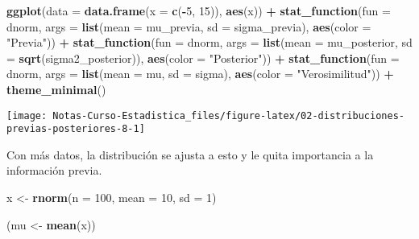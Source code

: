 \documentclass[
  12pt,
]{book}
\newenvironment{Shaded}{\begin{snugshade}}{\end{snugshade}}
\newcommand{\DataTypeTok}[1]{\textcolor[rgb]{0.13,0.29,0.53}{#1}}
\newcommand{\DecValTok}[1]{\textcolor[rgb]{0.00,0.00,0.81}{#1}}
\newcommand{\KeywordTok}[1]{\textcolor[rgb]{0.13,0.29,0.53}{\textbf{#1}}}
\newcommand{\NormalTok}[1]{#1}
\newcommand{\OperatorTok}[1]{\textcolor[rgb]{0.81,0.36,0.00}{\textbf{#1}}}
\newcommand{\StringTok}[1]{\textcolor[rgb]{0.31,0.60,0.02}{#1}}
\begin{document}
\begin{Shaded}
\begin{Highlighting}[]
\KeywordTok{ggplot}\NormalTok{(}\DataTypeTok{data =} \KeywordTok{data.frame}\NormalTok{(}\DataTypeTok{x =} \KeywordTok{c}\NormalTok{(}\OperatorTok{{-}}\DecValTok{5}\NormalTok{, }\DecValTok{15}\NormalTok{)), }\KeywordTok{aes}\NormalTok{(x)) }\OperatorTok{+}
\StringTok{  }\KeywordTok{stat\_function}\NormalTok{(}\DataTypeTok{fun =}\NormalTok{ dnorm, }\DataTypeTok{args =} \KeywordTok{list}\NormalTok{(}\DataTypeTok{mean =}\NormalTok{ mu\_previa, }\DataTypeTok{sd =}\NormalTok{ sigma\_previa), }\KeywordTok{aes}\NormalTok{(}\DataTypeTok{color =} \StringTok{"Previa"}\NormalTok{)) }\OperatorTok{+}
\StringTok{  }\KeywordTok{stat\_function}\NormalTok{(}\DataTypeTok{fun =}\NormalTok{ dnorm, }\DataTypeTok{args =} \KeywordTok{list}\NormalTok{(}\DataTypeTok{mean =}\NormalTok{ mu\_posterior, }\DataTypeTok{sd =} \KeywordTok{sqrt}\NormalTok{(sigma2\_posterior)), }\KeywordTok{aes}\NormalTok{(}\DataTypeTok{color =} \StringTok{"Posterior"}\NormalTok{)) }\OperatorTok{+}
\StringTok{  }\KeywordTok{stat\_function}\NormalTok{(}\DataTypeTok{fun =}\NormalTok{ dnorm, }\DataTypeTok{args =} \KeywordTok{list}\NormalTok{(}\DataTypeTok{mean =}\NormalTok{ mu, }\DataTypeTok{sd =}\NormalTok{ sigma), }\KeywordTok{aes}\NormalTok{(}\DataTypeTok{color =} \StringTok{"Verosimilitud"}\NormalTok{)) }\OperatorTok{+}
\StringTok{  }\KeywordTok{theme\_minimal}\NormalTok{()}
\end{Highlighting}
\end{Shaded}

\begin{center}\texttt{[image: Notas-Curso-Estadistica\_files/figure-latex/02-distribuciones-previas-posteriores-8-1]} \end{center}

Con más datos, la distribución se ajusta a esto y le quita importancia a la información previa.

\begin{Shaded}
\begin{Highlighting}[]
\NormalTok{x \textless{}{-}}\StringTok{ }\KeywordTok{rnorm}\NormalTok{(}\DataTypeTok{n =} \DecValTok{100}\NormalTok{, }\DataTypeTok{mean =} \DecValTok{10}\NormalTok{, }\DataTypeTok{sd =} \DecValTok{1}\NormalTok{)}

\NormalTok{(mu \textless{}{-}}\StringTok{ }\KeywordTok{mean}\NormalTok{(x))}
\end{Highlighting}
\end{Shaded}
\end{document}
